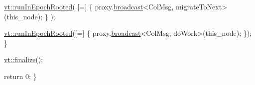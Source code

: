 \begin{DoxyCodeInclude}
    \hyperlink{namespacevt_a9f5cbbc484d7f14f2ad0ee46d62dfb6e}{vt::runInEpochRooted}(
      [=] \{ proxy.\hyperlink{structvt_1_1objgroup_1_1proxy_1_1_proxy_a0b716ca776b1f06e0d7d45afbe9e5274}{broadcast}<ColMsg, migrateToNext>(this\_node); \}
    );

    \hyperlink{namespacevt_a9f5cbbc484d7f14f2ad0ee46d62dfb6e}{vt::runInEpochRooted}([=] \{ proxy.\hyperlink{structvt_1_1objgroup_1_1proxy_1_1_proxy_a0b716ca776b1f06e0d7d45afbe9e5274}{broadcast}<ColMsg, doWork>(this\_node); \});
  \}

  \hyperlink{namespacevt_a540d90dbd6e97b69f1dcbc9ee9314cff}{vt::finalize}();

  \textcolor{keywordflow}{return} 0;
\}
\end{DoxyCodeInclude}
